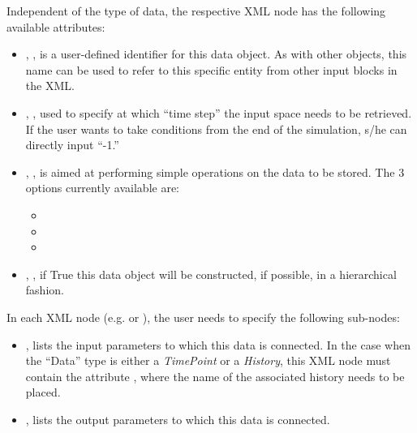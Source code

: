 Independent of the type of data, the respective XML node has the following
available attributes:
\vspace{-5mm}
\begin{itemize}
  \itemsep0em
  \item {}, , is a user-defined
  identifier for this data object.
  \nb As with other objects, this name can be used to refer to this specific
  entity from other input blocks in the XML.
  \item {}, , used to
  specify at which ``time step'' the input space needs to be retrieved.
  \nb If the user wants to take conditions from the end of the simulation, s/he
  can directly input ``-1.''
  \item {}, , is aimed at
  performing simple operations on the data to be stored.
  The 3 options currently available are:
  \begin{itemize}
    \item {}
    \item {}
    \item {}
  \end{itemize}
  \item {}, , if True
  this data object will be constructed, if possible, in a hierarchical fashion.
\end{itemize}
\vspace{-5mm}
In each XML node (e.g.  or ), the user
needs to specify the following sub-nodes:
\begin{itemize}
  \item {},  lists
  the input parameters to which this data is connected.
  \nb In the case when the ``Data'' type is either a \textit{TimePoint} or a
  \textit{History}, this XML node must contain the attribute ,
  where the name of the associated history needs to be placed.
  \item {},  lists
  the output parameters to which this data is connected.
\end{itemize}

